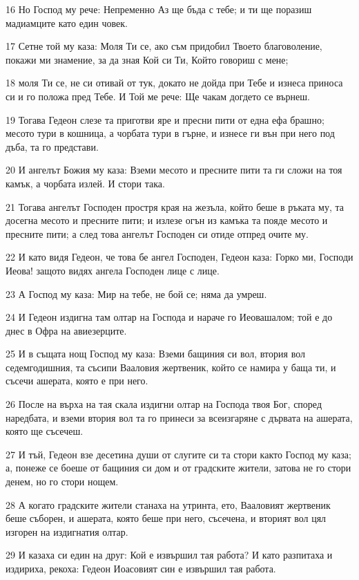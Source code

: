 \par 16 Но Господ му рече: Непременно Аз ще бъда с тебе; и ти ще поразиш мадиамците като един човек.
\par 17 Сетне той му каза: Моля Ти се, ако съм придобил Твоето благоволение, покажи ми знамение, за да зная Кой си Ти, Който говориш с мене;
\par 18 моля Ти се, не си отивай от тук, докато не дойда при Тебе и изнеса приноса си и го положа пред Тебе. И Той ме рече: Ще чакам догдето се върнеш.
\par 19 Тогава Гедеон слезе та приготви яре и пресни пити от една ефа брашно; месото тури в кошница, а чорбата тури в гърне, и изнесе ги вън при него под дъба, та го представи.
\par 20 И ангелът Божия му каза: Вземи месото и пресните пити та ги сложи на тоя камък, а чорбата излей. И стори така.
\par 21 Тогава ангелът Господен простря края на жезъла, който беше в ръката му, та досегна месото и пресните пити; и излезе огън из камъка та пояде месото и пресните пити; а след това ангелът Господен си отиде отпред очите му.
\par 22 И като видя Гедеон, че това бе ангел Господен, Гедеон каза: Горко ми, Господи Иеова! защото видях ангела Господен лице с лице.
\par 23 А Господ му каза: Мир на тебе, не бой се; няма да умреш.
\par 24 И Гедеон издигна там олтар на Господа и нараче го Иеовашалом; той е до днес в Офра на авиезерците.
\par 25 И в същата нощ Господ му каза: Вземи бащиния си вол, втория вол седемгодишния, та съсипи Вааловия жертвеник, който се намира у баща ти, и съсечи ашерата, която е при него.
\par 26 После на върха на тая скала издигни олтар на Господа твоя Бог, според наредбата, и вземи втория вол та го принеси за всеизгаряне с дървата на ашерата, която ще съсечеш.
\par 27 И тъй, Гедеон взе десетина души от слугите си та стори както Господ му каза; а, понеже се боеше от бащиния си дом и от градските жители, затова не го стори денем, но го стори нощем.
\par 28 А когато градските жители станаха на утринта, ето, Вааловият жертвеник беше съборен, и ашерата, която беше при него, съсечена, и вторият вол цял изгорен на издигнатия олтар.
\par 29 И казаха си един на друг: Кой е извършил тая работа? И като разпитаха и издириха, рекоха: Гедеон Иоасовият син е извършил тая работа.
